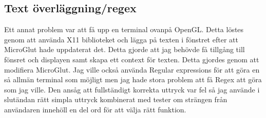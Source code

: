 \subsection{Text överläggning/regex}
Ett annat problem var att få upp en terminal ovanpå OpenGL. Detta löstes genom att använda X11 biblioteket och lägga på texten i fönstret efter att MicroGlut hade uppdaterat det. Detta gjorde att jag behövde få tillgång till fönsret och displayen samt skapa ett context för texten. Detta gjordes genom att modifiera MicroGlut. Jag ville också använda Regular expressions för att göra en så allmän terminal som möjligt men jag hade stora problem att få Regex att göra som jag ville. Den ansåg att fullständigt korrekta uttryck var fel så jag använde i slutändan rätt simpla uttryck kombinerat med tester om strängen från användaren innehöll en del ord för att välja rätt funktion.


